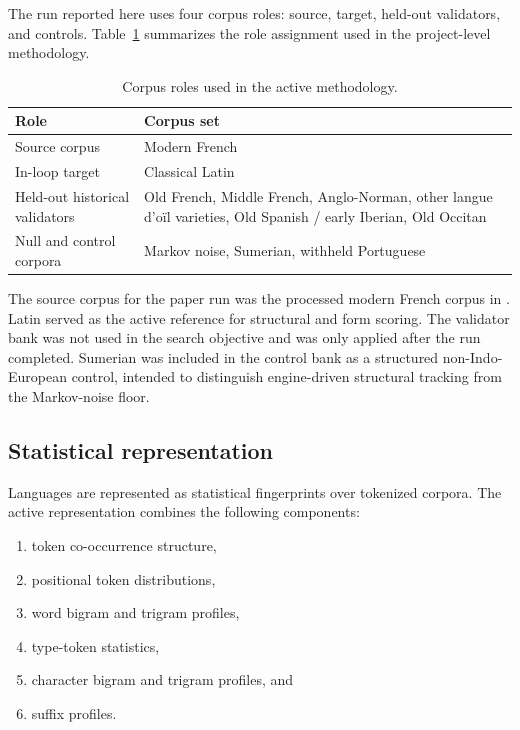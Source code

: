 \documentclass[11pt]{article}
\begin{document}
The run reported here uses four corpus roles: source, target, held-out
validators, and controls. Table~\ref{tab:corpusroles} summarizes the role
assignment used in the project-level methodology.

\begin{table}[h]
\centering
\caption{Corpus roles used in the active methodology.}
\label{tab:corpusroles}
\begin{tabular}{p{1.8in}p{3.8in}}
\toprule
Role & Corpus set \\
\midrule
Source corpus & Modern French \\
In-loop target & Classical Latin \\
Held-out historical validators & Old French, Middle French, Anglo-Norman,
other langue d'o\"il varieties, Old Spanish / early Iberian, Old Occitan \\
Null and control corpora & Markov noise, Sumerian, withheld Portuguese \\
\bottomrule
\end{tabular}
\end{table}

The source corpus for the paper run was the processed modern French corpus in
. Latin served as the active
reference for structural and form scoring. The validator bank was not used in
the search objective and was only applied after the run completed. Sumerian
was included in the control bank as a structured non-Indo-European control,
intended to distinguish engine-driven structural tracking from the
Markov-noise floor.

\subsection{Statistical representation}

Languages are represented as statistical fingerprints over tokenized corpora.
The active representation combines the following components:

\begin{enumerate}
    \item token co-occurrence structure,
    \item positional token distributions,
    \item word bigram and trigram profiles,
    \item type-token statistics,
    \item character bigram and trigram profiles, and
    \item suffix profiles.
\end{enumerate}
\end{document}
